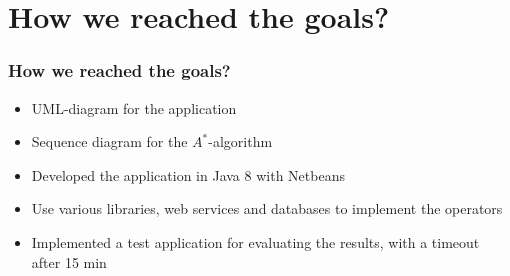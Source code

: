 \documentclass{beamer}
\begin{document}
\section{How we reached the goals?}
\begin{frame}
\frametitle{How we reached the goals?}
\begin{itemize}
	\item UML-diagram for the application
	\item Sequence diagram for the $A^*$-algorithm
	\item Developed the application in Java 8 with Netbeans

	\item Use various libraries, web services and databases to implement
	the operators
	
	\item Implemented a test application for evaluating the results, with
	a timeout after 15 min

	
	
	
\end{itemize}
\end{frame}


\end{document}
